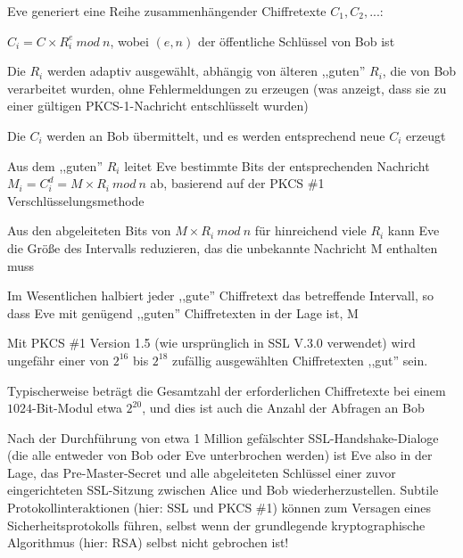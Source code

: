 \documentclass[a4paper]{article}
\begin{document}
\begin{multicols}{3}
\begin{itemize*}
\begin{itemize*}
                  \item Eve generiert eine Reihe zusammenhängender Chiffretexte $C_1 , C_2 , ...$:
                  \begin{itemize*}
                        \item $C_i = C\times R_i^e\ mod\ n$, wobei $(e, n)$ der öffentliche Schlüssel von Bob ist
                        \item Die $R_i$ werden adaptiv ausgewählt, abhängig von älteren ,,guten'' $R_i$, die von Bob verarbeitet wurden, ohne Fehlermeldungen zu erzeugen (was anzeigt, dass sie zu einer gültigen PKCS-1-Nachricht entschlüsselt wurden)
                        \item Die $C_i$ werden an Bob übermittelt, und es werden entsprechend neue $C_i$ erzeugt
                        \item Aus dem ,,guten'' $R_i$ leitet Eve bestimmte Bits der entsprechenden Nachricht $M_i= C_i^d = M\times R_i\ mod\ n$ ab, basierend auf der PKCS \#1 Verschlüsselungsmethode
                  \end{itemize*}
                  \item Aus den abgeleiteten Bits von $M\times R_i\ mod\ n$ für hinreichend viele $R_i$ kann Eve die Größe des Intervalls reduzieren, das die unbekannte Nachricht M enthalten muss
                  \item Im Wesentlichen halbiert jeder ,,gute'' Chiffretext das betreffende Intervall, so dass Eve mit genügend ,,guten'' Chiffretexten in der Lage ist, M
                  \item Mit PKCS \#1 Version 1.5 (wie ursprünglich in SSL V.3.0 verwendet) wird ungefähr einer von $2^{16}$ bis $2^{18}$ zufällig ausgewählten Chiffretexten ,,gut'' sein.
                  \item Typischerweise beträgt die Gesamtzahl der erforderlichen Chiffretexte bei einem $1024$-Bit-Modul etwa $2^{20}$, und dies ist auch die Anzahl der Abfragen an Bob
                  \item Nach der Durchführung von etwa 1 Million gefälschter SSL-Handshake-Dialoge (die alle entweder von Bob oder Eve unterbrochen werden) ist Eve also in der Lage, das Pre-Master-Secret und alle abgeleiteten Schlüssel einer zuvor eingerichteten SSL-Sitzung zwischen Alice und Bob wiederherzustellen. Subtile Protokollinteraktionen (hier: SSL und PKCS \#1) können zum Versagen eines Sicherheitsprotokolls führen, selbst wenn der grundlegende kryptographische Algorithmus (hier: RSA) selbst nicht gebrochen ist!
            \end{itemize*}

\end{itemize*}
\end{multicols}
\end{document}
